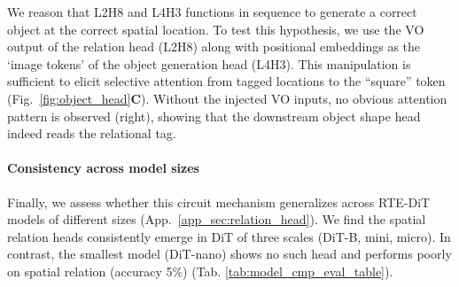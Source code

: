 \documentclass[10pt,twocolumn,letterpaper]{article}
\begin{document}
We reason that L2H8 and L4H3 functions in sequence to generate a correct object at the correct spatial location. To test this hypothesis, we use the VO output of the relation head (L2H8) along with positional embeddings as the `image tokens' of the object generation head (L4H3). 
This manipulation is sufficient to elicit selective attention from tagged locations to the “square” token (Fig.~\ref{fig:object_head}\textbf{C}). Without the injected VO inputs, no obvious attention pattern is observed (right), showing that the downstream object shape head indeed reads the relational tag. 





\paragraph{Consistency across model sizes} 
Finally, we assess whether this circuit mechanism generalizes across RTE-DiT models of different sizes (App.~\ref{app_sec:relation_head}). 
We find the spatial relation heads consistently emerge in DiT of three scales (DiT-B, mini, micro). 
In contrast, the smallest model (DiT-nano) shows no such head and performs poorly on spatial relation (accuracy 5\%) (Tab. \ref{tab:model_cmp_eval_table}). 
\end{document}
